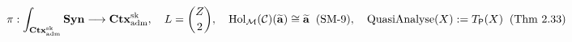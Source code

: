 \documentclass[preview]{standalone}
\begin{document}
\begin{align*}
\special{dvisvgm:raw <g id='unique000'>}\pi: \int_{\mathbf{Ctx}_{\text{adm}}^{\text{sk}}} \mathbf{Syn} \longrightarrow \mathbf{Ctx}_{\text{adm}}^{\text{sk}}, \quad L = \binom{Z}{2},\quad \operatorname{Hol}_{\mathcal{M}}(\mathcal{C})(\widetilde{\mathbf{a}}) \cong \widetilde{\mathbf{a}}\;\; (\text{SM-9}),\quad \operatorname{QuasiAnalyse}(X) := T_{\mathsf{P}}(X)\;\; (\text{Thm 2.33})\special{dvisvgm:raw </g>}
\end{align*}
\end{document}
